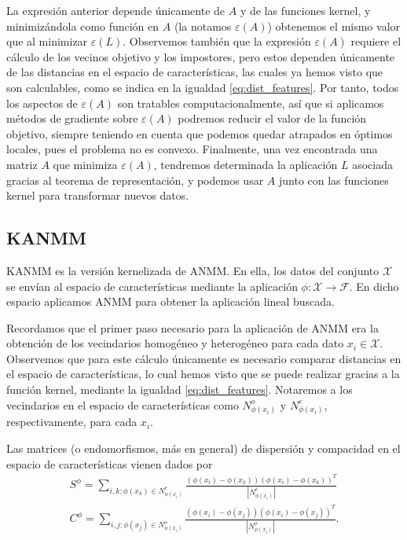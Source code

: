 La expresión anterior depende únicamente de $A$ y de las funciones kernel, y minimizándola como función en $A$ (la notamos $\varepsilon(A)$) obtenemos el mismo valor que al minimizar $\varepsilon(L)$. Observemos también que la expresión $\varepsilon(A)$ requiere el cálculo de los vecinos objetivo y los impostores, pero estos dependen únicamente de las distancias en el espacio de características, las cuales ya hemos visto que son calculables, como se indica en la igualdad \ref{eq:dist_features}. Por tanto, todos los aspectos de $\varepsilon(A)$ son tratables computacionalmente, así que si aplicamos métodos de gradiente sobre $\varepsilon(A)$ podremos reducir el valor de la función objetivo, siempre teniendo en cuenta que podemos quedar atrapados en óptimos locales, pues el problema no es convexo. Finalmente, una vez encontrada una matriz $A$ que minimiza $\varepsilon(A)$, tendremos determinada la aplicación $L$ asociada gracias al teorema de representación, y podemos usar $A$ junto con las funciones kernel para transformar nuevos datos. 

\subsection{KANMM}

KANMM \cite{anmm} es la versión kernelizada de ANMM. En ella, los datos del conjunto $\mathcal{X}$ se envían al espacio de características mediante la aplicación $\phi\colon \mathcal{X} \to \mathcal{F}$. En dicho espacio aplicamos ANMM para obtener la aplicación lineal buscada.

Recordamos que el primer paso necesario para la aplicación de ANMM era la obtención de los vecindarios homogéneo y heterogéneo para cada dato $x_i \in \mathcal{X}$. Observemos que para este cálculo únicamente es necesario comparar distancias en el espacio de características, lo cual hemos visto que se puede realizar gracias a la función kernel, mediante la igualdad \ref{eq:dist_features}. Notaremos a los vecindarios en el espacio de características como $N_{\phi(x_i)}^o$ y $N_{\phi(x_i)}^e$, respectivamente, para cada $x_i$.

Las matrices (o endomorfismos, más en general) de dispersión y compacidad en el espacio de características vienen dados por
\begin{align*}
    S^{\phi} = \sum\limits_{i,k \colon \phi(x_k) \in N_{\phi(x_i)}^e} \frac{(\phi(x_i)-\phi(x_k))(\phi(x_i)-\phi(x_k))^T}{|N_{\phi(x_i)}^e|} \\
    C^{\phi} = \sum\limits_{i,j \colon \phi(x_j) \in N_{\phi(x_i)}^o} \frac{(\phi(x_i)-\phi(x_j))(\phi(x_i)-\phi(x_j))^T}{|N_{\phi(x_i)}^o|}.
\end{align*}

